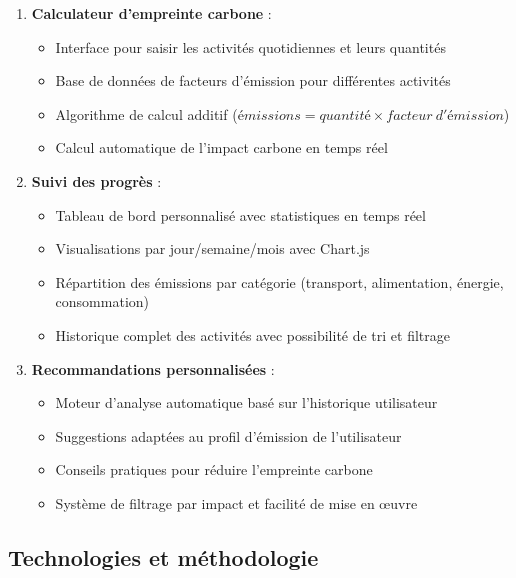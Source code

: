 \documentclass[a4paper,11pt]{article}
\begin{document}
    \begin{enumerate}
        \item \textbf{Calculateur d'empreinte carbone} :
            \begin{itemize}
                \item Interface pour saisir les activités quotidiennes et leurs quantités
                \item Base de données de facteurs d'émission pour différentes activités
                \item Algorithme de calcul additif ($émissions = quantité \times facteur\ d'émission$)
                \item Calcul automatique de l'impact carbone en temps réel
            \end{itemize}
            
        \item \textbf{Suivi des progrès} :
            \begin{itemize}
                \item Tableau de bord personnalisé avec statistiques en temps réel
                \item Visualisations par jour/semaine/mois avec Chart.js
                \item Répartition des émissions par catégorie (transport, alimentation, énergie, consommation)
                \item Historique complet des activités avec possibilité de tri et filtrage
            \end{itemize}
            
        \item \textbf{Recommandations personnalisées} :
            \begin{itemize}
                \item Moteur d'analyse automatique basé sur l'historique utilisateur
                \item Suggestions adaptées au profil d'émission de l'utilisateur
                \item Conseils pratiques pour réduire l'empreinte carbone
                \item Système de filtrage par impact et facilité de mise en œuvre
            \end{itemize}
    \end{enumerate}

    \subsection{Technologies et méthodologie}
\end{document}
